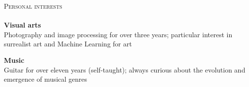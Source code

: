 \documentclass[a4paper]{article}
\newcommand{\lineunder} {
	\vspace*{-8pt} \\
	\hspace*{-18pt} {\color{header}{\hrulefill}} \\
}
\newcommand{\header} [1] {
	{\hspace*{-18pt}\vspace*{6pt}
		{\fontfamily{qag}\selectfont \textsc{{\large #1}}}}
	\vspace*{-6pt} \lineunder
}
\begin{document}
\header{\textcolor{header}{Personal interests}}

\textbf{Visual arts}\\
\textcolor{Paragraph}{Photography and image processing for over three years; particular interest in surrealist art and Machine Learning for art}\\
\vspace{2mm}

\textbf{Music}\\
\textcolor{Paragraph}{Guitar for over eleven years (self-taught); always curious about the evolution and emergence of musical genres}
\vspace{2mm}
%

\ 
\end{document}
